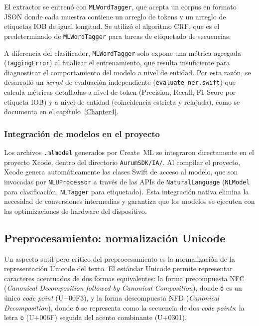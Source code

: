 El extractor se entrenó con \texttt{MLWord\-Tagger}, que acepta un corpus en formato JSON donde cada muestra contiene un arreglo de tokens y un arreglo de etiquetas IOB de igual longitud. Se utilizó el algoritmo CRF, que es el predeterminado de \texttt{MLWord\-Tagger} para tareas de etiquetado de secuencias.

A diferencia del clasificador, \texttt{MLWord\-Tagger} solo expone una métrica agregada (\texttt{tagging\-Error}) al finalizar el entrenamiento, que resulta insuficiente para diagnosticar el comportamiento del modelo a nivel de entidad. Por esta razón, se desarrolló un \textit{script} de evaluación independiente (\texttt{evaluate\_ner.swift}) que calcula métricas detalladas a nivel de token (Precision, Recall, F1-Score por etiqueta IOB) y a nivel de entidad (coincidencia estricta y relajada), como se documenta en el capítulo~\ref{Chapter4}.

\subsubsection{Integración de modelos en el proyecto}

Los archivos \texttt{.mlmodel} generados por Create~ML se integraron directamente en el proyecto Xcode, dentro del directorio \texttt{AurumSDK/IA/}. Al compilar el proyecto, Xcode genera automáticamente las clases Swift de acceso al modelo, que son invocadas por \texttt{NLU\-Processor} a través de las APIs de \texttt{Natural\-Language} (\texttt{NLModel} para clasificación, \texttt{NLTagger} para etiquetado). Esta integración nativa elimina la necesidad de conversiones intermedias y garantiza que los modelos se ejecuten con las optimizaciones de hardware del dispositivo.

\subsection{Preprocesamiento: normalización Unicode}
\label{subsec:unicode-nfc}

Un aspecto sutil pero crítico del preprocesamiento es la normalización de la representación Unicode del texto. El estándar Unicode permite representar caracteres acentuados de dos formas equivalentes: la forma precompuesta NFC (\textit{Canonical Decomposition followed by Canonical Composition}), donde \texttt{ó} es un único \textit{code point} (U+00F3), y la forma descompuesta NFD (\textit{Canonical Decomposition}), donde \texttt{ó} se representa como la secuencia de dos \textit{code points}: la letra \texttt{o} (U+006F) seguida del acento combinante (U+0301).

